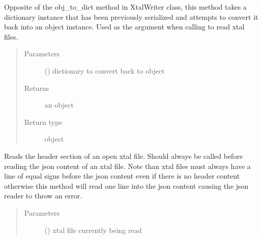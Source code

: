 \documentclass[letterpaper,10pt,english]{sphinxmanual}
\begin{document}
\begin{fulllineitems}
\begin{fulllineitems}
\label{\detokenize{polo.utils:polo.utils.io_utils.RunDeserializer.dict_to_obj}}
Opposite of the obj\_to\_dict method in XtalWriter class, this method
takes a dictionary instance that has been previously serialized and
attempts to convert it back into an object instance. Used as the
 argument when calling  to read xtal files.
\begin{quote}\begin{description}
\item[{Parameters}] \leavevmode
{} () \textendash{} dictionary to convert back to object

\item[{Returns}] \leavevmode
an object

\item[{Return type}] \leavevmode
object

\end{description}\end{quote}

\end{fulllineitems}


\begin{fulllineitems}
\label{\detokenize{polo.utils:polo.utils.io_utils.RunDeserializer.make_read_xtal_thread}}
\end{fulllineitems}


\begin{fulllineitems}
\label{\detokenize{polo.utils:polo.utils.io_utils.RunDeserializer.xtal_header_reader}}
Reads the header section of an open xtal file. Should always be
called before reading the json content of an xtal file. Note than
xtal files must always have a line of equal signs before the json
content even if there is no header content otherwise this method will
read one line into the json content causing the json reader to
throw an error.
\begin{quote}\begin{description}
\item[{Parameters}] \leavevmode
{} () \textendash{} xtal file currently being read


\end{description}
\end{quote}
\end{fulllineitems}
\end{fulllineitems}
\end{document}
